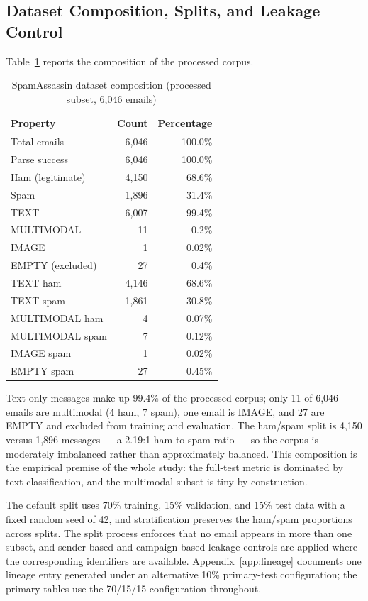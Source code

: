 \documentclass[10pt,twoside]{article}
\begin{document}
\subsection{Dataset Composition, Splits, and Leakage Control}\label{sec:composition}

Table~\ref{tab:composition} reports the composition of the processed corpus.

\begin{table}[t]
\centering
\caption{SpamAssassin dataset composition (processed subset, 6,046 emails)}
\label{tab:composition}
\small
\setlength{\tabcolsep}{4pt}
\begin{tabular}{lrr}
\toprule
Property & Count & Percentage \\
\midrule
Total emails & 6,046 & 100.0\% \\
Parse success & 6,046 & 100.0\% \\
Ham (legitimate) & 4,150 & 68.6\% \\
Spam & 1,896 & 31.4\% \\
TEXT & 6,007 & 99.4\% \\
MULTIMODAL & 11 & 0.2\% \\
IMAGE & 1 & 0.02\% \\
EMPTY (excluded) & 27 & 0.4\% \\
TEXT ham & 4,146 & 68.6\% \\
TEXT spam & 1,861 & 30.8\% \\
MULTIMODAL ham & 4 & 0.07\% \\
MULTIMODAL spam & 7 & 0.12\% \\
IMAGE spam & 1 & 0.02\% \\
EMPTY spam & 27 & 0.45\% \\
\bottomrule
\end{tabular}
\end{table}

Text-only messages make up 99.4\% of the processed corpus; only 11 of 6,046 emails are multimodal (4 ham, 7 spam), one email is IMAGE, and 27 are EMPTY and excluded from training and evaluation. The ham/spam split is 4,150 versus 1,896 messages --- a 2.19:1 ham-to-spam ratio --- so the corpus is moderately imbalanced rather than approximately balanced. This composition is the empirical premise of the whole study: the full-test metric is dominated by text classification, and the multimodal subset is tiny by construction.

The default split uses 70\% training, 15\% validation, and 15\% test data with a fixed random seed of 42, and stratification preserves the ham/spam proportions across splits. The split process enforces that no email appears in more than one subset, and sender-based and campaign-based leakage controls are applied where the corresponding identifiers are available. Appendix~\ref{app:lineage} documents one lineage entry generated under an alternative 10\% primary-test configuration; the primary tables use the 70/15/15 configuration throughout.
\end{document}
